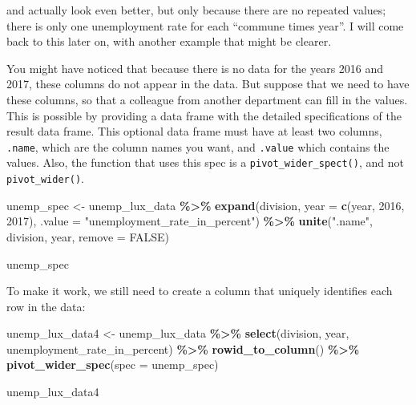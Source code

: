 \documentclass[
]{article}
\newenvironment{Shaded}{\begin{snugshade}}{\end{snugshade}}
\newcommand{\DataTypeTok}[1]{\textcolor[rgb]{0.13,0.29,0.53}{#1}}
\newcommand{\DecValTok}[1]{\textcolor[rgb]{0.00,0.00,0.81}{#1}}
\newcommand{\KeywordTok}[1]{\textcolor[rgb]{0.13,0.29,0.53}{\textbf{#1}}}
\newcommand{\NormalTok}[1]{#1}
\newcommand{\OperatorTok}[1]{\textcolor[rgb]{0.81,0.36,0.00}{\textbf{#1}}}
\newcommand{\OtherTok}[1]{\textcolor[rgb]{0.56,0.35,0.01}{#1}}
\newcommand{\StringTok}[1]{\textcolor[rgb]{0.31,0.60,0.02}{#1}}
\begin{document}
and actually look even better, but only because there are no repeated values; there is only one
unemployment rate for each ``commune times year''. I will come back to this later on, with another
example that might be clearer.

You might have noticed that because there is no data for
the years 2016 and 2017, these columns do not appear in the data. But suppose that we need to have
these columns, so that a colleague from another department can fill in the values. This is possible
by providing a data frame with the detailed specifications of the result data frame. This optional
data frame must have at least two columns, \texttt{.name}, which are the column names you want, and
\texttt{.value} which contains the values. Also, the function that uses this spec is a \texttt{pivot\_wider\_spect()},
and not \texttt{pivot\_wider()}.

\begin{Shaded}
\begin{Highlighting}[]
\NormalTok{unemp\_spec \textless{}{-}}\StringTok{ }\NormalTok{unemp\_lux\_data }\OperatorTok{\%\textgreater{}\%}\StringTok{ }
\StringTok{  }\KeywordTok{expand}\NormalTok{(division, }\DataTypeTok{year =} \KeywordTok{c}\NormalTok{(year, }\DecValTok{2016}\NormalTok{, }\DecValTok{2017}\NormalTok{), }\DataTypeTok{.value =} \StringTok{"unemployment\_rate\_in\_percent"}\NormalTok{) }\OperatorTok{\%\textgreater{}\%}
\StringTok{  }\KeywordTok{unite}\NormalTok{(}\StringTok{".name"}\NormalTok{, division, year, }\DataTypeTok{remove =} \OtherTok{FALSE}\NormalTok{)}

\NormalTok{unemp\_spec}
\end{Highlighting}
\end{Shaded}

To make it work, we still need to create a column that uniquely identifies each row in the data:

\begin{Shaded}
\begin{Highlighting}[]
\NormalTok{unemp\_lux\_data4 \textless{}{-}}\StringTok{ }\NormalTok{unemp\_lux\_data }\OperatorTok{\%\textgreater{}\%}\StringTok{ }
\StringTok{  }\KeywordTok{select}\NormalTok{(division, year, unemployment\_rate\_in\_percent) }\OperatorTok{\%\textgreater{}\%}\StringTok{ }
\StringTok{  }\KeywordTok{rowid\_to\_column}\NormalTok{() }\OperatorTok{\%\textgreater{}\%}\StringTok{ }
\StringTok{  }\KeywordTok{pivot\_wider\_spec}\NormalTok{(}\DataTypeTok{spec =}\NormalTok{ unemp\_spec) }

\NormalTok{unemp\_lux\_data4}
\end{Highlighting}
\end{Shaded}
\end{document}
